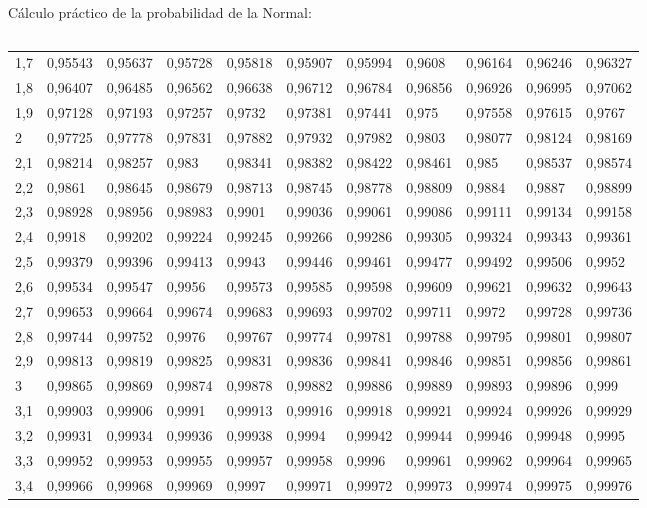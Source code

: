 \documentclass[11pt,handout]{beamer}
\begin{document}
\begin{frame}{Cálculo práctico de la probabilidad de la Normal:}
\begin{columns}
\begin{column}{0.6\textwidth}
{\begin{tabular}{l|llllllllll}
1,7 & 0,95543 & 0,95637 & 0,95728 & 0,95818 & 0,95907 & 0,95994 & 0,9608  & 0,96164 & 0,96246 & 0,96327 \\
1,8 & 0,96407 & 0,96485 & 0,96562 & 0,96638 & 0,96712 & 0,96784 & 0,96856 & 0,96926 & 0,96995 & 0,97062 \\
1,9 & 0,97128 & 0,97193 & 0,97257 & 0,9732  & 0,97381 & 0,97441 & 0,975   & 0,97558 & 0,97615 & 0,9767  \\
2   & 0,97725 & 0,97778 & 0,97831 & 0,97882 & 0,97932 & 0,97982 & 0,9803  & 0,98077 & 0,98124 & 0,98169 \\
2,1 & 0,98214 & 0,98257 & 0,983   & 0,98341 & 0,98382 & 0,98422 & 0,98461 & 0,985   & 0,98537 & 0,98574 \\
2,2 & 0,9861  & 0,98645 & 0,98679 & 0,98713 & 0,98745 & 0,98778 & 0,98809 & 0,9884  & 0,9887  & 0,98899 \\
2,3 & 0,98928 & 0,98956 & 0,98983 & 0,9901  & 0,99036 & 0,99061 & 0,99086 & 0,99111 & 0,99134 & 0,99158 \\
2,4 & 0,9918  & 0,99202 & 0,99224 & 0,99245 & 0,99266 & 0,99286 & 0,99305 & 0,99324 & 0,99343 & 0,99361 \\
2,5 & 0,99379 & 0,99396 & 0,99413 & 0,9943  & 0,99446 & 0,99461 & 0,99477 & 0,99492 & 0,99506 & 0,9952  \\
2,6 & 0,99534 & 0,99547 & 0,9956  & 0,99573 & 0,99585 & 0,99598 & 0,99609 & 0,99621 & 0,99632 & 0,99643 \\
2,7 & 0,99653 & 0,99664 & 0,99674 & 0,99683 & 0,99693 & 0,99702 & 0,99711 & 0,9972  & 0,99728 & 0,99736 \\
2,8 & 0,99744 & 0,99752 & 0,9976  & 0,99767 & 0,99774 & 0,99781 & 0,99788 & 0,99795 & 0,99801 & 0,99807 \\
2,9 & 0,99813 & 0,99819 & 0,99825 & 0,99831 & 0,99836 & 0,99841 & 0,99846 & 0,99851 & 0,99856 & 0,99861 \\
3   & 0,99865 & 0,99869 & 0,99874 & 0,99878 & 0,99882 & 0,99886 & 0,99889 & 0,99893 & 0,99896 & 0,999   \\
3,1 & 0,99903 & 0,99906 & 0,9991  & 0,99913 & 0,99916 & 0,99918 & 0,99921 & 0,99924 & 0,99926 & 0,99929 \\
3,2 & 0,99931 & 0,99934 & 0,99936 & 0,99938 & 0,9994  & 0,99942 & 0,99944 & 0,99946 & 0,99948 & 0,9995  \\
3,3 & 0,99952 & 0,99953 & 0,99955 & 0,99957 & 0,99958 & 0,9996  & 0,99961 & 0,99962 & 0,99964 & 0,99965 \\
3,4 & 0,99966 & 0,99968 & 0,99969 & 0,9997  & 0,99971 & 0,99972 & 0,99973 & 0,99974 & 0,99975 & 0,99976 \\

\end{tabular}}
\end{column}
\end{columns}
\end{frame}
\end{document}
